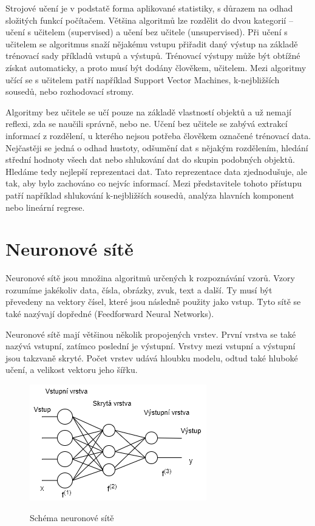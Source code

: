 Strojové učení je v podstatě forma aplikované statistiky,
s důrazem na odhad složitých funkcí počítačem.
Většina algoritmů lze rozdělit do dvou kategorií --
učení s učitelem (supervised) 
a učení bez učitele (unsupervised).
Při učení s učitelem se algoritmus snaží nějakému vstupu přiřadit daný výstup
na základě trénovací sady příkladů vstupů a výstupů.
Trénovací výstupy může být obtížné získat automaticky,
a proto musí být dodány člověkem, učitelem.
Mezi algoritmy učící se s učitelem patří například Support Vector Machines,
k-nejbližších sousedů, nebo rozhodovací stromy.
\cite{Goodfellow-et-al-2016}
\par

Algoritmy bez učitele se učí pouze na základě vlastností objektů 
a už nemají reflexi, zda se naučili správně, nebo ne.
Učení bez učitele se zabývá extrakcí informací z rozdělení,
u kterého nejsou potřeba člověkem označené trénovací data.
Nejčastěji se jedná o odhad hustoty, odšumění dat s nějakým rozdělením,
hledání střední hodnoty všech dat 
nebo shlukování dat do skupin podobných objektů.
Hledáme tedy nejlepší reprezentaci dat.
Tato reprezentace data zjednodušuje, ale tak, 
aby bylo zachováno co nejvíc informací.
Mezi představitele tohoto přístupu patří například 
shlukování k-nejbližších sousedů, 
analýza hlavních komponent nebo lineární regrese. 
\cite{Goodfellow-et-al-2016}

\section{Neuronové sítě}
Neuronové sítě jsou množina algoritmů určených k rozpoznávání vzorů.
Vzory rozumíme jakékoliv data, čísla, obrázky, zvuk, text a další.
Ty musí být převedeny na vektory čísel, 
které jsou následně použity jako vstup.
Tyto sítě se také nazývají dopředné (Feedforward Neural Networks).
\cite{Nicholson_NeuralNets}
\par

Neuronové sítě mají většinou několik propojených vrstev.
První vrstva se také nazývá vstupní, 
zatímco poslední je výstupní.
Vrstvy mezi vstupní a výstupní jsou takzvaně skryté.
Počet vrstev udává hloubku modelu, odtud také hluboké učení, 
a velikost vektoru jeho šířku.

\begin{figure}[h]\centering
    \centering
    \includegraphics[width=0.6\linewidth]{obrazky/NNSchema.png}\\[1pt]  
    \caption{Schéma neuronové sítě}    
    \label{obrazekSchemaNeuronoveSite}
\end{figure}

